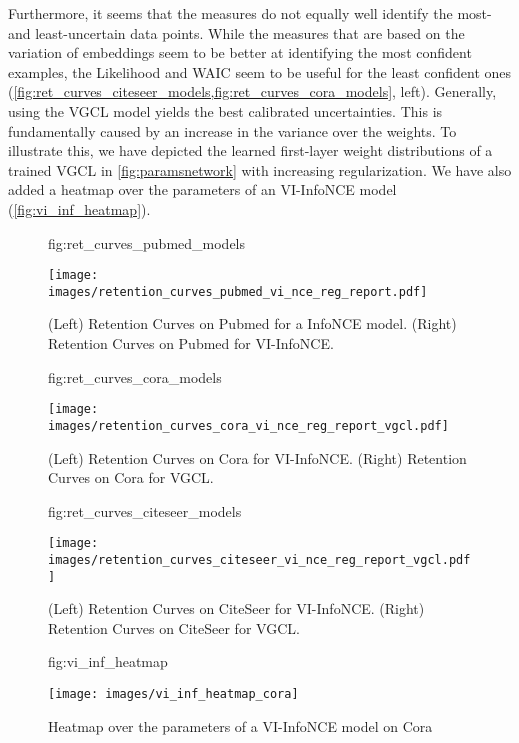 \documentclass[tablecaption=bottom,wcp]{jmlr} %
\begin{document}
Furthermore, it seems that the measures do not equally well identify the most- and least-uncertain data points. While the measures that are based on the variation of embeddings seem to be better at identifying the most confident examples, the Likelihood and WAIC seem to be useful for the least confident ones (\cref{fig:ret_curves_citeseer_models,fig:ret_curves_cora_models}, left). Generally, using the VGCL model yields the best calibrated uncertainties. This is fundamentally caused by an increase in the variance over the weights. To illustrate this, we have depicted the learned first-layer weight distributions of a trained VGCL in \cref{fig:paramsnetwork} with increasing regularization. We have also added a heatmap over the parameters of an VI-InfoNCE model (\cref{fig:vi_inf_heatmap}).



\begin{figure}[!h]
 \floatconts
  {fig:ret_curves_pubmed_models}
  {\caption{ (Left) Retention Curves on Pubmed for a InfoNCE model. (Right) Retention Curves on Pubmed for VI-InfoNCE.  }}
  {\texttt{[image: images/retention\_curves\_pubmed\_vi\_nce\_reg\_report.pdf]}}
\end{figure}

\begin{figure}[!h]
\floatconts
  {fig:ret_curves_cora_models}
  {\caption{ (Left) Retention Curves on Cora for VI-InfoNCE. (Right) Retention Curves on Cora for VGCL.  }}
  {\texttt{[image: images/retention\_curves\_cora\_vi\_nce\_reg\_report\_vgcl.pdf]}}
\end{figure}




\begin{figure}[!h]
\floatconts
  {fig:ret_curves_citeseer_models}
  {\caption{ (Left) Retention Curves on CiteSeer for VI-InfoNCE. (Right) Retention Curves on CiteSeer for VGCL.  }}
  {\texttt{[image: images/retention\_curves\_citeseer\_vi\_nce\_reg\_report\_vgcl.pdf]}}
\end{figure}




\begin{figure}[!h]
\floatconts
  {fig:vi_inf_heatmap}
  {\caption{Heatmap over the parameters of a VI-InfoNCE model on Cora}}
  {\texttt{[image: images/vi\_inf\_heatmap\_cora]}}
\end{figure}
\end{document}
